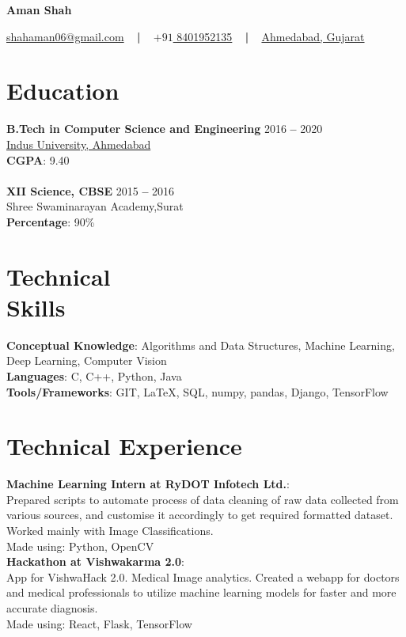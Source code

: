 \documentclass[margin, centered]{res}
\begin{document}
	\begin{center}
		\hspace{-\hoffset}
		\huge\textbf{Aman Shah}
	\end{center}
	\begin{center}
		\hspace{-\hoffset}
		\href{mailto:shahaman06@gmail.com}{shahaman06@gmail.com}
		~ \textbf{|} ~
		\href{tel:+918401952135}{\(+91\) 8401952135}
		~ \textbf{|} ~
		\href{https://goo.gl/maps/QqRrJzxewF82}{Ahmedabad, Gujarat}
	\end{center}

	\begin{resume}
		\section{Education}
			\textbf{B.Tech in Computer Science and Engineering} \hfill 2016 \textbf{--} 2020 \\
			\href{https://www.indusuni.ac.in/}{Indus University, Ahmedabad}\\
			\textbf{CGPA}: 9.40\\ %
			\\
			\textbf{XII Science, CBSE} \hfill 2015 \textbf{--} 2016 \\
			Shree Swaminarayan Academy,Surat \\
			\textbf{Percentage}: 90\%
		
		\section{Technical \\ Skills}
			\textbf{Conceptual Knowledge}: Algorithms and Data Structures, Machine Learning, Deep Learning, Computer Vision\\
			\textbf{Languages}: C, C++, Python, Java \\
			\textbf{Tools/Frameworks}: GIT, \LaTeX, SQL, numpy, pandas, Django, TensorFlow
		
		\section{Technical Experience}
			\textbf{Machine Learning Intern at RyDOT Infotech Ltd.}:\\
			Prepared scripts to automate process of data cleaning of raw data collected from \\various sources, and customise it accordingly to get required formatted dataset. Worked mainly with Image Classifications.\\
			Made using: Python, OpenCV\\
			\textbf{Hackathon at Vishwakarma 2.0}:\\
			App for VishwaHack 2.0. Medical Image analytics. Created a webapp for doctors and medical professionals to utilize machine learning models for faster and more accurate diagnosis.\\
			Made using: React, Flask, TensorFlow


\end{resume}
\end{document}
